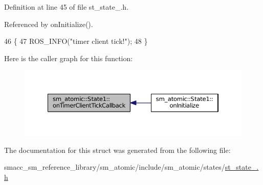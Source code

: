 Definition at line 45 of file st\+\_\+state\+\_.\+h.



Referenced by on\+Initialize().


\begin{DoxyCode}
46     \{
47         ROS\_INFO(\textcolor{stringliteral}{"timer client tick!"});
48     \}
\end{DoxyCode}


Here is the caller graph for this function\+:
\nopagebreak
\begin{figure}[H]
\begin{center}
\leavevmode
\includegraphics[width=350pt]{structsm__atomic_1_1State1_adea28f0a0fcedb210a29656f53aeee09_icgraph}
\end{center}
\end{figure}




The documentation for this struct was generated from the following file\+:\begin{DoxyCompactItemize}
\item 
smacc\+\_\+sm\+\_\+reference\+\_\+library/sm\+\_\+atomic/include/sm\+\_\+atomic/states/\hyperlink{sm__atomic_2include_2sm__atomic_2states_2st__state__1_8h}{st\+\_\+state\+\_.\+h}\end{DoxyCompactItemize}
